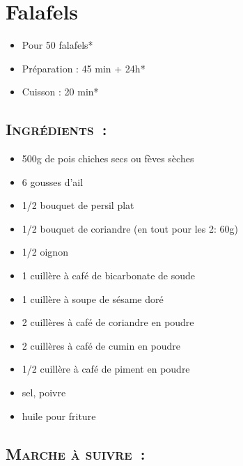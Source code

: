 \section{Falafels}

\begin{itemize}
\item Pour 50 falafels*		%
\item Préparation : 45 min + 24h*		%
\item Cuisson : 20 min*			%
\end{itemize}

\subsection*{\textsc{Ingrédients~:}}

\begin{itemize}
\item 500g de pois chiches secs ou fèves sèches
\item 6 gousses d'ail
\item 1/2 bouquet de persil plat
\item 1/2 bouquet de coriandre (en tout pour les 2: 60g)
\item 1/2 oignon
\item 1 cuillère à café de bicarbonate de soude
\item 1 cuillère à soupe de sésame doré
\item 2 cuillères à café de coriandre en poudre
\item 2 cuillères à café de cumin en poudre
\item 1/2 cuillère à café de piment en poudre
\item sel, poivre
\item huile pour friture
\end{itemize}


\subsection*{\textsc{Marche à suivre~:}}

